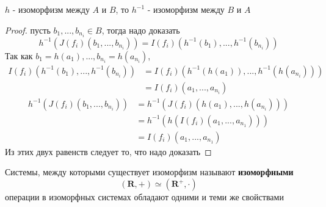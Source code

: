 \documentclass[../main/document.tex]{subfiles}
\begin{document}
\begin{thm}\label{isomorphism-inverse}
$h$ - изоморфизм между $A$ и $B$, то $h^{-1}$ - изоморфизм между $B$ и $A$
\begin{proof} пусть $b_1,...,b_{n_i}\in B$, тогда надо доказать
$$h^{-1}(J(f_i)(b_1,...,b_{n_i}))=I(f_i)(h^{-1}(b_1),...,h^{-1}(b_{n_i}))$$
Так как $b_1=h(a_1),...,b_{n_i}=h(a_{n_i})$,
\begin{align*}
I(f_i)(h^{-1}(b_1),...,h^{-1}(b_{n_i}))&=I(f_i)(h^{-1}(h(a_1)),...,h^{-1}(h(a_{n_i})))\\
&=I(f_i)(a_1,...,a_{n_i})
\end{align*}
\begin{align*}
h^{-1}(J(f_i)(b_1,...,b_{n_i}))&=h^{-1}(J(f_i)(h(a_1),...,h(a_{n_i})))\\
&=h^{-1}(h(I(f_i)(a_1,...,a_{n_1})))\\
&=I(f_i)(a_1,...,a_{n_1})
\end{align*}
Из этих двух равенств следует то, что надо доказать
\end{proof}
\end{thm}

\begin{dfn}
Системы, между которыми существует изоморфизм называют \textbf{изоморфными}
$$(\mathbf{R},+)\simeq(\mathbf{R}^+,\cdot)$$
операции в изоморфных системах обладают одними и теми же свойствами
\end{dfn}
\end{document}
